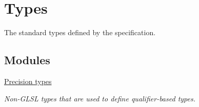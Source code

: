 \hypertarget{group__core__types}{}\section{Types}
\label{group__core__types}


The standard types defined by the specification.  


\subsection*{Modules}
\begin{DoxyCompactItemize}
\item 
\hyperlink{group__core__precision}{Precision types}
\begin{DoxyCompactList}\small\item\em Non-\/\+G\+L\+SL types that are used to define qualifier-\/based types. \end{DoxyCompactList}\end{DoxyCompactItemize}
